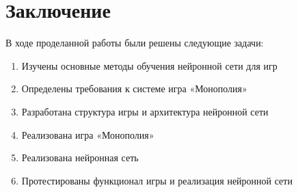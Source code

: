 \newpage
\section*{Заключение}
В ходе проделанной работы были решены следующие задачи:
\begin{spacing}{0.9}
\begin{enumerate}
    \item Изучены основные методы обучения нейронной сети для игр 
    \item Определены требования к системе игра «Монополия»
    \item Разработана структура игры и архитектура нейронной сети
    \item Реализована игра «Монополия»
    \item Реализована нейронная сеть 
    \item Протестированы функционал игры и реализация нейронной сети
\end{enumerate}
\end{spacing}